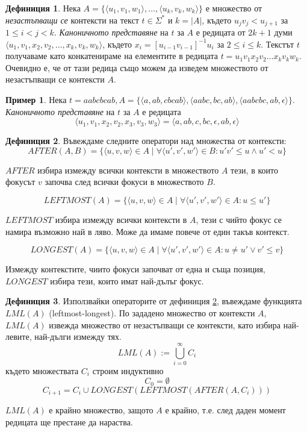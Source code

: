 \documentclass[12pt, oneside]{article}
\theoremstyle{definition}
\newtheorem{definition}{Дефиниция}[section]
\newtheorem{example}{Пример}[section]
\begin{document}
\begin{definition}
	Нека \(A = \{ \langle u_1, v_1, w_1 \rangle, \dots , \langle u_k, v_k, w_k \rangle \}\) е множество от \emph{незастъпващи се} контексти на текст \(t \in \Sigma^*\) и \(k = |A|\), където \( u_jv_j < u_{j+1} \) за \( 1 \le i < j < k \). \emph{Каноничното представяне} на \(t\) за \(A\) е редицата от \(2k+1\) думи \( \langle u_1, v_1, x_2, v_2, \dots , x_k, v_k, w_k \rangle \), където \( x_i = [u_{i-1}v_{i-1}]^{-1}u_i \) за \( 2 \le i \le k \). Текстът \(t\) получаваме като конкатенираме на елементите в редицата \(t = u_1v_1x_2v_2 \dots x_kv_kw_k \). Очевидно е, че от тази редица също можем да изведем множеството от незастъпващи се контексти \(A\).
\end{definition}

\begin{example}
	Нека \( t = aabcbcab, A = \{ \langle a, ab, cbcab \rangle, \langle aabc, bc, ab \rangle, \langle aabcbc, ab, \epsilon \rangle \} \). \emph{Каноничното представяне} на \(t\) за \(A\) е редицата
	\[ \langle u_1, v_1, x_2, v_2, x_3, v_3, w_3 \rangle = \langle a, ab, c, bc, \epsilon, ab, \epsilon \rangle \]
\end{example}

\begin{definition}\label{def:LmlOps}
	Въвеждаме следните оператори над множества от контексти:
\[ AFTER(A, B) = \{ \langle u, v, w \rangle \in A \mid \forall \langle u', v', w' \rangle \in B : u'v' \leq u \land u' < u  \} \] 

\( AFTER \) избира измежду всички контексти в множеството \(A\) тези, в които фокусът \(v\) започва след всички фокуси в множеството \(B\).

\[ LEFTMOST(A) = \{ \langle u, v, w \rangle \in A \mid \forall \langle u', v', w' \rangle \in A : u \leq u' \} \]

\( LEFTMOST \) избира измежду всички контексти в \(A\), тези с чийто фокус се намира възможно най в ляво. Може да имаме повече от един такъв контекст.

\[ LONGEST(A) = \{ \langle u, v, w \rangle \in A \mid \forall \langle u', v', w' \rangle \in A : u \neq u' \lor v' \leq v \} \]

Измежду контекстите, чиито фокуси започват от една и съща позиция, \( LONGEST \) избира тези, които имат най-дълъг фокус.
\end{definition}

\begin{definition}
	Използвайки операторите от дефиниция \ref{def:LmlOps}, въвеждаме функцията \( LML(A) \) (leftmost-longest). По зададено множество от контексти \(A\), \( LML(A) \) извежда множество от незастъпващи се контексти, като избира най-левите, най-дълги измежду тях.
	\[ LML(A) := \bigcup\limits_{i=0}^{\infty} C_{i} \]
	където множествата \( C_i \) строим индуктивно
	\[ C_0 = \emptyset \]
	\[ C_{i+1} = C_i \cup LONGEST(LEFTMOST(AFTER(A, C_i))) \]

	\noindent \( LML(A) \) е крайно множество, защото \( A \) е крайно, т.е. след даден момент редицата ще престане да нараства.
\end{definition}
\end{document}
